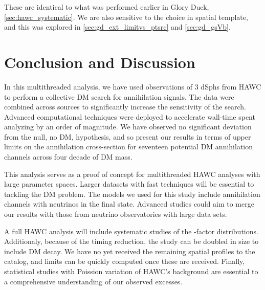 These are identical to what was performed earlier in Glory Duck, \cref{sec:hawc_systematic}.
We are also sensitive to the choice in spatial template, and this was explored in \cref{sec:gd_ext_limitvs_ptsrc} and \cref{sec:gd_gsVb}.

\section{Conclusion and Discussion}\label{sec:mtd_conclusion}

In this multithreaded analysis, we have used observations of 3 dSphs from HAWC to perform a collective DM search for annihilation signals.
The data were combined across sources to significantly increase the sensitivity of the search.
Advanced computational techniques were deployed to accelerate wall-time spent analyzing by an order of magnitude.
We have observed no significant deviation from the null, no DM, hypothesis, and so present our results in terms of upper limits on the annihilation cross-section for seventeen potential DM annihilation channels across four decade of DM mass.

This analysis serves as a proof of concept for multithreaded HAWC analyses with large parameter spaces.
Larger datasets with fast techniques will be essential to tackling the DM problem.
The models we used for this study include annihilation channels with neutrinos in the final state.
Advanced studies could aim to merge our results with those from neutrino observatories with large data sets.

A full HAWC analysis will include systematic studies of the \J-factor distributions.
Additionaly, because of the timing reduction, the study can be doubled in size to include DM decay.
We have no yet received the remaining spatial profiles to the \LS catalog, and limits can be quickly computed once these are received.
Finally, statistical studies with Poission variation of HAWC's background are essential to a comprehensive understanding of our observed excesses.